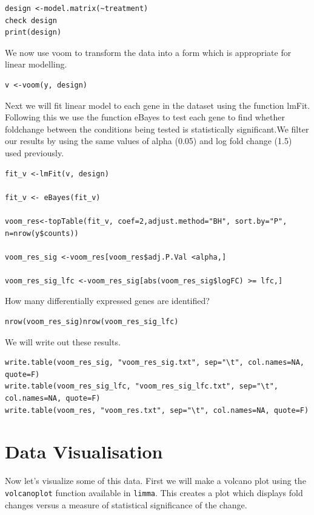 \begin{steps}
\begin{steps}
\begin{lstlisting}
design <-model.matrix(~treatment)
check design
print(design)
\end{lstlisting}
We now use voom to transform the data into a form which is appropriate for linear modelling.
\begin{lstlisting}
v <-voom(y, design)
\end{lstlisting}
\end{steps}
Next we will fit linear model to each gene in the dataset using the function lmFit.  Following this we use the function eBayes to test  each gene to find whether foldchange between the conditions being tested is statistically significant.We filter our results by using the same values of alpha (0.05) and log fold change (1.5) used previously.

\begin{steps}
\begin{lstlisting}
fit_v <-lmFit(v, design) 

fit_v <- eBayes(fit_v)

voom_res<-topTable(fit_v, coef=2,adjust.method="BH", sort.by="P", n=nrow(y$counts)) 

voom_res_sig <-voom_res[voom_res$adj.P.Val <alpha,]

voom_res_sig_lfc <-voom_res_sig[abs(voom_res_sig$logFC) >= lfc,]
\end{lstlisting}
\end{steps}

How many differentially expressed genes are identified?

\begin{steps}
\begin{lstlisting}nrow(voom_res_sig)nrow(voom_res_sig_lfc)
\end{lstlisting}
\end{steps}
We will write out these results.

\begin{steps}
\begin{lstlisting}
write.table(voom_res_sig, "voom_res_sig.txt", sep="\t", col.names=NA, quote=F)
write.table(voom_res_sig_lfc, "voom_res_sig_lfc.txt", sep="\t", col.names=NA, quote=F)
write.table(voom_res, "voom_res.txt", sep="\t", col.names=NA, quote=F) 
\end{lstlisting}
\end{steps}

\section{Data Visualisation}
Now let’s visualize some of this data. First we will make a volcano plot using the \texttt{volcanoplot} function available in \texttt{limma}. This creates a plot which displays fold changes versus a measure of statistical significance of the change.


\end{steps}
